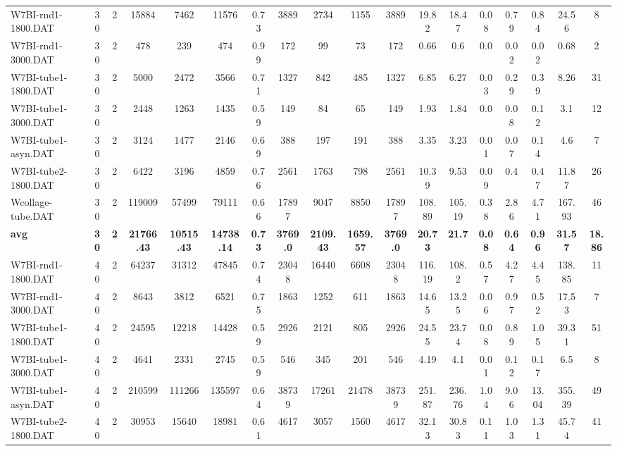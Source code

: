 \begin{sidewaystable}[h]
{\begin{tabular}{lccccccccccccccccc}
W7BI-rnd1-1800.DAT & 30 & 2 & 15884 & 7462 & 11576 & 0.73 & 3889 & 2734 & 1155 & 3889 & 19.82 & 18.47 & 0.08 & 0.79 & 0.84 & 24.56 & 8\\
W7BI-rnd1-3000.DAT & 30 & 2 & 478 & 239 & 474 & 0.99 & 172 & 99 & 73 & 172 & 0.66 & 0.6 & 0.0 & 0.02 & 0.02 & 0.68 & 2\\
W7BI-tube1-1800.DAT & 30 & 2 & 5000 & 2472 & 3566 & 0.71 & 1327 & 842 & 485 & 1327 & 6.85 & 6.27 & 0.03 & 0.29 & 0.39 & 8.26 & 31\\
W7BI-tube1-3000.DAT & 30 & 2 & 2448 & 1263 & 1435 & 0.59 & 149 & 84 & 65 & 149 & 1.93 & 1.84 & 0.0 & 0.08 & 0.12 & 3.1 & 12\\
W7BI-tube1-asyn.DAT & 30 & 2 & 3124 & 1477 & 2146 & 0.69 & 388 & 197 & 191 & 388 & 3.35 & 3.23 & 0.01 & 0.07 & 0.14 & 4.6 & 7\\
W7BI-tube2-1800.DAT & 30 & 2 & 6422 & 3196 & 4859 & 0.76 & 2561 & 1763 & 798 & 2561 & 10.39 & 9.53 & 0.09 & 0.4 & 0.47 & 11.87 & 26\\
Wcollage-tube.DAT & 30 & 2 & 119009 & 57499 & 79111 & 0.66 & 17897 & 9047 & 8850 & 17897 & 108.89 & 105.19 & 0.38 & 2.86 & 4.71 & 167.93 & 46\\
\cline{1-18} \textbf{avg} & \textbf{30} & \textbf{2} & \textbf{21766.43} & \textbf{10515.43} & \textbf{14738.14} & \textbf{0.73} & \textbf{3769.0} & \textbf{2109.43} & \textbf{1659.57} & \textbf{3769.0} & \textbf{20.73} & \textbf{21.7} & \textbf{0.08} & \textbf{0.64} & \textbf{0.96} & \textbf{31.57} & \textbf{18.86} \\ \cline{1-18}
W7BI-rnd1-1800.DAT & 40 & 2 & 64237 & 31312 & 47845 & 0.74 & 23048 & 16440 & 6608 & 23048 & 116.19 & 108.2 & 0.57 & 4.27 & 4.45 & 138.85 & 11\\
W7BI-rnd1-3000.DAT & 40 & 2 & 8643 & 3812 & 6521 & 0.75 & 1863 & 1252 & 611 & 1863 & 14.65 & 13.25 & 0.06 & 0.97 & 0.52 & 17.53 & 7\\
W7BI-tube1-1800.DAT & 40 & 2 & 24595 & 12218 & 14428 & 0.59 & 2926 & 2121 & 805 & 2926 & 24.55 & 23.74 & 0.08 & 0.89 & 1.05 & 39.31 & 51\\
W7BI-tube1-3000.DAT & 40 & 2 & 4641 & 2331 & 2745 & 0.59 & 546 & 345 & 201 & 546 & 4.19 & 4.1 & 0.01 & 0.12 & 0.17 & 6.5 & 8\\
W7BI-tube1-asyn.DAT & 40 & 2 & 210599 & 111266 & 135597 & 0.64 & 38739 & 17261 & 21478 & 38739 & 251.87 & 236.76 & 1.04 & 9.06 & 13.04 & 355.39 & 49\\
W7BI-tube2-1800.DAT & 40 & 2 & 30953 & 15640 & 18981 & 0.61 & 4617 & 3057 & 1560 & 4617 & 32.13 & 30.83 & 0.11 & 1.03 & 1.31 & 45.74 & 41\\

\end{tabular}}
\end{sidewaystable}
